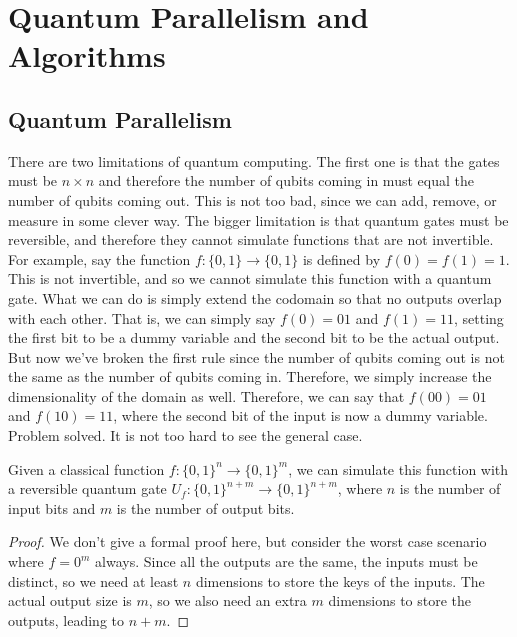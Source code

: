 \documentclass{article}
\begin{document}
\section{Quantum Parallelism and Algorithms}

  \subsection{Quantum Parallelism}

    There are two limitations of quantum computing. The first one is that the gates must be $n \times n$ and therefore the number of qubits coming in must equal the number of qubits coming out. This is not too bad, since we can add, remove, or measure in some clever way. The bigger limitation is that quantum gates must be reversible, and therefore they cannot simulate functions that are not invertible. For example, say the function $f: \{0, 1\} \longrightarrow \{0, 1\}$ is defined by $f(0) = f(1) = 1$. This is not invertible, and so we cannot simulate this function with a quantum gate. What we can do is simply extend the codomain so that no outputs overlap with each other. That is, we can simply say $f(0) = 01$ and $f(1) = 11$, setting the first bit to be a dummy variable and the second bit to be the actual output. But now we've broken the first rule since the number of qubits coming out is not the same as the number of qubits coming in. Therefore, we simply increase the dimensionality of the domain as well. Therefore, we can say that $f(00) = 01$ and $f(10) = 11$, where the second bit of the input is now a dummy variable. Problem solved. It is not too hard to see the general case. 

    \begin{lemma}
      Given a classical function $f: \{0, 1\}^n \longrightarrow \{0, 1\}^m$, we can simulate this function with a reversible quantum gate $U_f: \{0, 1\}^{n+m} \longrightarrow \{0, 1\}^{n+m}$, where $n$ is the number of input bits and $m$ is the number of output bits.
    \end{lemma}
    \begin{proof} 
      We don't give a formal proof here, but consider the worst case scenario where $f = 0^m$ always. Since all the outputs are the same, the inputs must be distinct, so we need at least $n$ dimensions to store the keys of the inputs. The actual output size is $m$, so we also need an extra $m$ dimensions to store the outputs, leading to $n + m$. 
    \end{proof}
\end{document}
